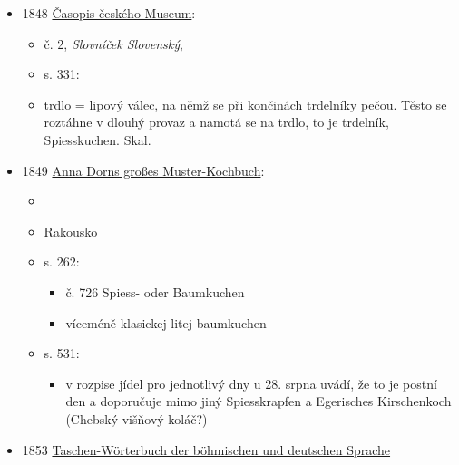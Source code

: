 \begin{itemize}
  \begin{itemize}
  \tightlist
  \item
    popis svatby v Ivančicích
  \end{itemize}
\item
  1848
  \href{https://books.google.com/books?id=fnZGAAAAcAAJ&q=Trdeln\%C3\%ADk&pg=PA331}{Časopis
  českého Museum}:

  \begin{itemize}
  \tightlist
  \item
    č. 2, \emph{Slovníček Slovenský}, 
  \item
    s. 331:
  \item
    trdlo = lipový válec, na němž se při končinách trdelníky pečou.
    Těsto se roztáhne v dlouhý provaz a namotá se na trdlo, to je
    trdelník, Spiesskuchen. Skal.
  \end{itemize}
\item
  1849
  \href{https://www.digital.wienbibliothek.at/wbrobv/content/titleinfo/2739695}{Anna
  Dorn\textquotesingle s großes Muster-Kochbuch}:

  \begin{itemize}
  \tightlist
  \item
  \item
    Rakousko
  \item
    s. 262:

    \begin{itemize}
    \tightlist
    \item
      č. 726 Spiess- oder Baumkuchen
    \item
      víceméně klasickej litej baumkuchen
    \end{itemize}
  \item
    s. 531:

    \begin{itemize}
    \tightlist
    \item
      v rozpise jídel pro jednotlivý dny u 28. srpna uvádí, že to je
      postní den a doporučuje mimo jiný Spiesskrapfen a Egerisches
      Kirschenkoch (Chebský višňový koláč?)
    \end{itemize}
  \end{itemize}
\item
  1853
  \href{https://www.google.cz/books/edition/Taschen_W\%C3\%B6rterbuch_der_b\%C3\%B6hmischen_und/tDlFAAAAYAAJ?hl=cs&gbpv=1&dq=trdeln\%C3\%ADk&pg=PA462&printsec=frontcover}{Taschen-Wörterbuch
  der böhmischen und deutschen Sprache}


\end{itemize}
